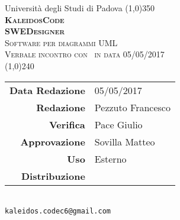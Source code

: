 \documentclass[a4paper,12pt]{article}
\author{KaleidosCode}
\date{05/05/2017}
\begin{document}
	\begin{titlepage}
		\centering Università degli Studi di Padova
		\line(1,0){350}\\
		\vspace{0.4cm}
		{\bfseries\scshape\LARGE KaleidosCode\\}
		\vspace{0.4cm}
		{\bfseries\scshape\LARGE SWEDesigner\\}
		{\scshape\Large Software per diagrammi UML\\}
		\vspace{1cm}
		{\scshape\Large Verbale incontro con \proponente\ in data 05/05/2017 \\}		%
		\vspace{1.4cm}
		\logo
		\vspace{1.2cm}
		\line(1,0){240}\\
		\begin{tabular}{r|l}
			{\hfill \textbf{Data Redazione}} 	& 05/05/2017\\	%
			{\hfill \textbf{Redazione}} 		& Pezzuto Francesco\\
			{\hfill \textbf{Verifica}} 			& Pace Giulio\\
			{\hfill \textbf{Approvazione}} 		& Sovilla Matteo\\
			{\hfill \textbf{Uso}} 				& Esterno\\
			{\hfill \textbf{Distribuzione}} 	& \kaleidoscode\\
		\end{tabular}\\
		\vspace{2cm}
		\texttt{kaleidos.codec6@gmail.com}
	\end{titlepage}

	\pagestyle{mymain}
	\newpage
		
		
	\label{LastPage}
\end{document}

